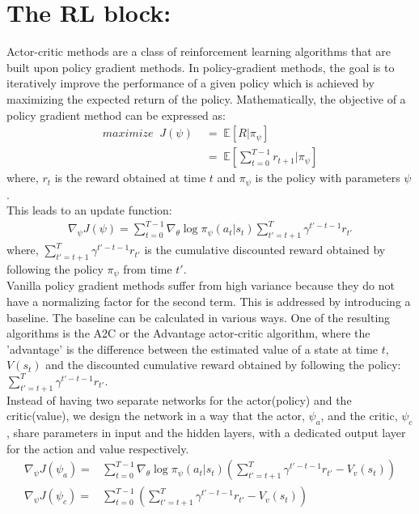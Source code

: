 \section*{The RL block:}

Actor-critic methods are a class of reinforcement learning algorithms that are built upon policy gradient methods. 
In policy-gradient methods, the goal is to iteratively improve the performance of a given policy which is achieved by maximizing the expected return of the policy. Mathematically, the objective of a policy gradient method can be expressed as:
\begin{align}
maximize \;\; J( \psi )  &\; = \; \mathbb{E} [ R | \pi_{\psi} ] \\
                       & \; = \; \mathbb{E}[ \sum^{T-1}_{t=0} r_{t+1}| \pi_{\psi}] 
\end{align}
where, $r_{t}$ is the reward obtained at time $t$ and $\pi_{\psi}$ is the policy with parameters $\psi$.\\
This leads to an update function:
\begin{align}
\label{eq:policy-gradient-update}
\nabla_{\psi} J (\psi) = \sum_{t=0}^{T-1} \nabla_{\theta}\log \pi_{\psi}(a_{t}|s_{t})\sum_{t'=t+1}^{T} \gamma^{t'-t-1} r_{t'}
\end{align} 
where, $\sum_{t'=t+1}^{T} \gamma^{t'-t-1} r_{t'}$ is the cumulative discounted reward obtained by following the policy $\pi_{\psi}$ from time $t'$.\\
Vanilla policy gradient methods suffer from high variance because they do not have a normalizing factor for the second term. This is addressed by introducing a baseline. The baseline can be calculated in various ways. One of the resulting algorithms is the A2C or the Advantage actor-critic algorithm, where the 'advantage' is the difference between the estimated value of a state at time $t$, $V(s_t)$ and the discounted cumulative reward obtained by following the policy: $\sum_{t'=t+1}^{T} \gamma^{t'-t-1} r_{t'}$. \\
Instead of having two separate networks for the actor(policy) and the critic(value), we design the network in a way that the actor, $\psi_{a}$, and the critic, $\psi_{c}$, share parameters in input and the hidden layers, with a dedicated output layer for the action and value respectively.
\begin{align}
\label{eq:advantage-actor-update}
\nabla_{\psi} J (\psi_{a}) = & \sum_{t=0}^{T-1} \nabla_{\theta}\log \pi_{\psi}(a_{t}|s_{t}) \left(\sum_{t'=t+1}^{T} \gamma^{t'-t-1} r_{t'} - V_{v}(s_{t})\right)\\
\label{eq:advantage-critic-update}
\nabla_{\psi} J (\psi_{c}) = & \sum_{t=0}^{T-1} \left(\sum_{t'=t+1}^{T} \gamma^{t'-t-1} r_{t'} - V_{v}(s_{t})\right)
\end{align} 
